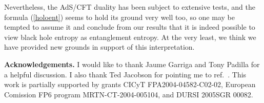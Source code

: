 \documentclass[12pt]{article}
\newcommand{\reef}[1]{(\ref{#1})}
\begin{document}
Nevertheless, the AdS/CFT duality has been subject to extensive tests,
and the formula \reef{holoent} seems to hold its ground very well too,
so one may be tempted to assume it and conclude from our results that it
is indeed possible to view black hole entropy as entanglement entropy.
At the very least, we think we have provided new grounds in support of
this interpretation. 


\bigskip


\noindent\textbf{Acknowledgements.} I would like to thank Jaume Garriga
and Tony Padilla for a helpful discussion. I also thank Ted Jacobson for
pointing me to ref.~\cite{hms}. This work is partially supported by
grants CICyT FPA2004-04582-C02-02, European Comission FP6 program
MRTN-CT-2004-005104, and DURSI 2005SGR 00082.
\end{document}
